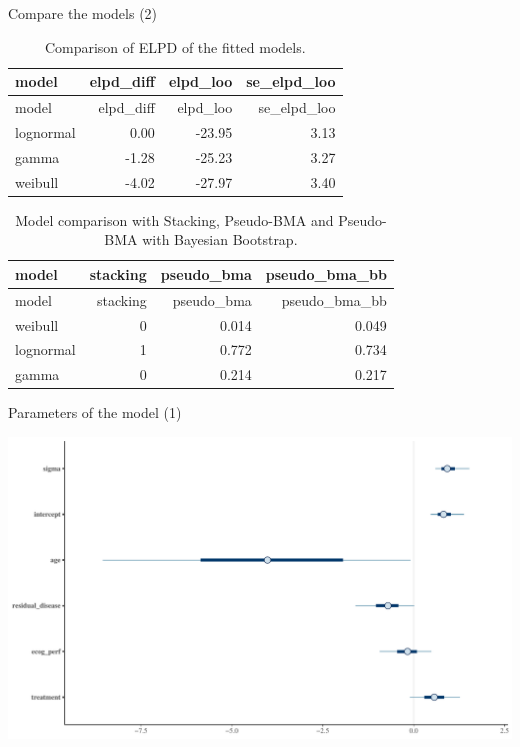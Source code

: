 \documentclass[ignorenonframetext,a4paper]{beamer}
\begin{document}
\begin{frame}{Compare the models (2)}

\scriptsize

\begin{longtable}[]{@{}lrrr@{}}
\caption{Comparison of ELPD of the fitted models.}\tabularnewline
\toprule
model & elpd\_diff & elpd\_loo & se\_elpd\_loo\tabularnewline
\midrule
\endfirsthead
\toprule
model & elpd\_diff & elpd\_loo & se\_elpd\_loo\tabularnewline
\midrule
\endhead
lognormal & 0.00 & -23.95 & 3.13\tabularnewline
gamma & -1.28 & -25.23 & 3.27\tabularnewline
weibull & -4.02 & -27.97 & 3.40\tabularnewline
\bottomrule
\end{longtable}

\begin{longtable}[]{@{}lrrr@{}}
\caption{Model comparison with Stacking, Pseudo-BMA and Pseudo-BMA with
Bayesian Bootstrap.}\tabularnewline
\toprule
model & stacking & pseudo\_bma & pseudo\_bma\_bb\tabularnewline
\midrule
\endfirsthead
\toprule
model & stacking & pseudo\_bma & pseudo\_bma\_bb\tabularnewline
\midrule
\endhead
weibull & 0 & 0.014 & 0.049\tabularnewline
lognormal & 1 & 0.772 & 0.734\tabularnewline
gamma & 0 & 0.214 & 0.217\tabularnewline
\bottomrule
\end{longtable}

\end{frame}

\begin{frame}{Parameters of the model (1)}

\includegraphics{DB_presentation_case_study_files/figure-beamer/unnamed-chunk-22-1.pdf}

\end{frame}
\end{document}
